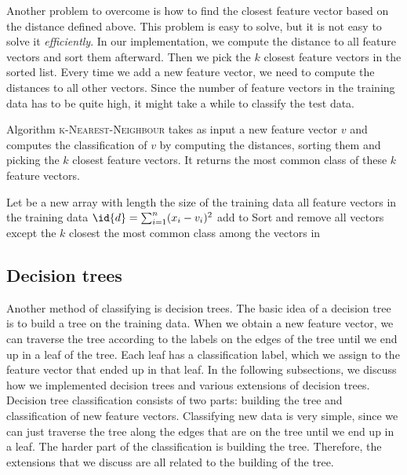\documentclass[10pt,a4paper]{article}
\begin{document}
Another problem to overcome is how to find the closest feature vector based on the distance defined above. This problem is easy to solve, but it is not easy to solve it \emph{efficiently}. In our implementation, we compute the distance to all feature vectors and sort them afterward. Then we pick the $k$ closest feature vectors in the sorted list. Every time we add a new feature vector, we need to compute the distances to all other vectors. Since the number of feature vectors in the training data has to be quite high, it might take a while to classify the test data.

Algorithm \textsc{k-Nearest-Neighbour} takes as input a new feature vector $v$ and computes the classification of $v$ by computing the distances, sorting them and picking the $k$ closest feature vectors. It returns the most common class of these $k$ feature vectors.

\begin{codebox}
\li Let  be a new array with length the size of the training data
\li \For all feature vectors  in the training data \Do
\li	$\id{d} = \sum_{i=1}^n (x_i - v_i)^2$
\li	add  to 
\End
\li Sort  and remove all vectors except the $k$ closest
\li \Return the most common class among the vectors in 
\end{codebox}
\subsection{Decision trees}
Another method of classifying is decision trees. The basic idea of a decision tree is to build a tree on the training data. When we obtain a new feature vector, we can traverse the tree according to the labels on the edges of the tree until we end up in a leaf of the tree. Each leaf has a classification label, which we assign to the feature vector that ended up in that leaf. In the following subsections, we discuss how we implemented decision trees and various extensions of decision trees. Decision tree classification consists of two parts: building the tree and classification of new feature vectors. Classifying new data is very simple, since we can just traverse the tree along the edges that are on the tree until we end up in a leaf. The harder part of the classification is building the tree. Therefore, the extensions that we discuss are all related to the building of the tree.
\end{document}
